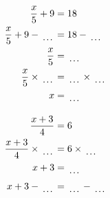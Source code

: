 \documentclass[12pt]{article}
\newcounter{minipagecount}
\begin{document}
\begin{multicols}{2}
\begin{minipage}[t]{0.45\textwidth}
    \raggedright %
    \begin{align*} %
        \frac{x}{5} + 9 &= 18\\
        \frac{x}{5} + 9 - \dotuline{\hspace{5mm}} &= 18 - \dotuline{\hspace{5mm}}\\
        \frac{x}{5} &= \dotuline{\hspace{5mm}}\\
        \frac{x}{5} \times\dotuline{\hspace{5mm}} &= \dotuline{\hspace{5mm}} \times\dotuline{\hspace{5mm}}\\
        x &= \dotuline{\hspace{5mm}}\\
    \end{align*}
\end{minipage}\newpage
\noindent{(\theminipagecount)}\hspace{0.1mm} %
\begin{minipage}[t]{0.45\textwidth} %
    \vspace{-26pt}  %
    \raggedright %
    \begin{align*} %
        \frac{x + 3}{4} &= 6\\
        \frac{x + 3}{4} \times\dotuline{\hspace{5mm}} &= 6 \times\dotuline{\hspace{5mm}}\\
        x + 3 &= \dotuline{\hspace{5mm}}\\
        x + 3 - \dotuline{\hspace{5mm}} &= \dotuline{\hspace{5mm}} - \dotuline{\hspace{5mm}}\\

\end{align*}
\end{minipage}
\end{multicols}
\end{document}
